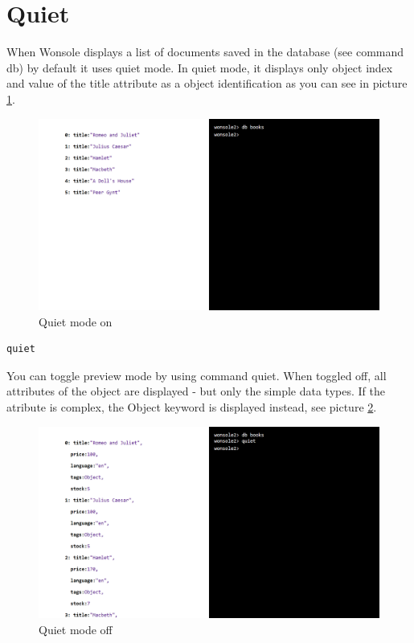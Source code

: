 \documentclass[10pt,a4paper,oneside]{report}
\begin{document}
\section{Quiet}
When Wonsole displays a list of documents saved in the database (see command
db) by default it uses quiet mode. In quiet mode, it displays only object index and
value of the title attribute as a object identification as you can see in
picture \ref{wonsole2-18}.

\begin{figure}
\centering
\includegraphics[width=\textwidth]{screenshot/wonsole2/wonsole2-18.png}
\caption{Quiet mode on}
\label{wonsole2-18}
\end{figure}

\begin{verbatim}
quiet
\end{verbatim}

You can toggle preview mode by using command quiet. When toggled off, all
attributes of the object are displayed - but only the simple data types. If the
atribute is complex, the Object keyword is displayed instead, see picture
\ref{wonsole2-20}.

\begin{figure}
\centering
\includegraphics[width=\textwidth]{screenshot/wonsole2/wonsole2-20.png}
\caption{Quiet mode off}
\label{wonsole2-20}
\end{figure}
\end{document}
